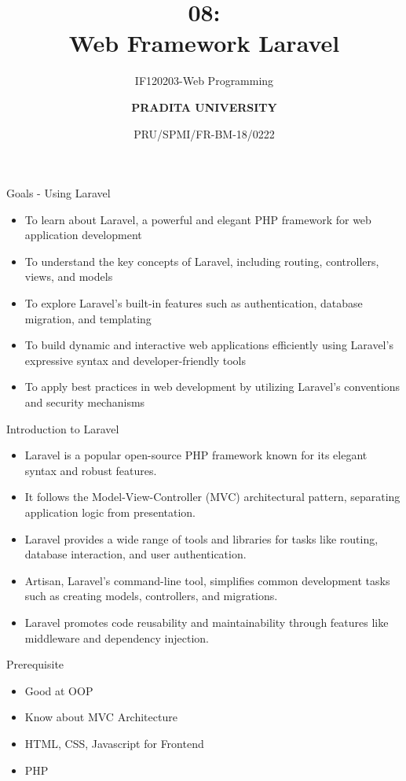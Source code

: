 \documentclass[aspectratio=169, table]{beamer}
\subtitle{IF120203-Web Programming}
\title{\Huge {\textbf{08: \\Web Framework Laravel}}}
\date[Serial]{\scriptsize {PRU/SPMI/FR-BM-18/0222}}
\author[Pradita]{\small {\textbf{PRADITA UNIVERSITY}}}
\begin{document}
\begin{frame}
    \titlepage
\end{frame}

\begin{frame}{Goals - Using Laravel}
    \vskip-1cm
    \begin{itemize}
        \item To learn about Laravel, a powerful and elegant PHP framework for web application development
        \item To understand the key concepts of Laravel, including routing, controllers, views, and models
        \item To explore Laravel's built-in features such as authentication, database migration, and templating
        \item To build dynamic and interactive web applications efficiently using Laravel's expressive syntax and developer-friendly tools
        \item To apply best practices in web development by utilizing Laravel's conventions and security mechanisms
    \end{itemize}
\end{frame}

\begin{frame}{Introduction to Laravel}
    \vskip-0.5cm
    \begin{itemize}
        \item Laravel is a popular open-source PHP framework known for its elegant syntax and robust features.
        \item It follows the Model-View-Controller (MVC) architectural pattern, separating application logic from presentation.
        \item Laravel provides a wide range of tools and libraries for tasks like routing, database interaction, and user authentication.
        \item Artisan, Laravel's command-line tool, simplifies common development tasks such as creating models, controllers, and migrations.
        \item Laravel promotes code reusability and maintainability through features like middleware and dependency injection.
    \end{itemize}
\end{frame}

\begin{frame}{Prerequisite}
    \vskip-1cm
    \begin{itemize}
        \item Good at OOP
        \item Know about MVC Architecture
        \item HTML, CSS, Javascript for Frontend
        \item PHP
    \end{itemize}
\end{frame}
\end{document}
